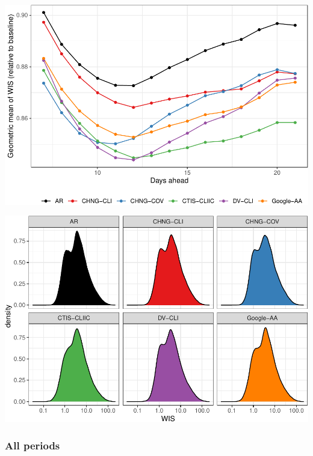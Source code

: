 \documentclass[9pt,twoside,lineno]{pnas-new}
\begin{document}
\begin{center}\includegraphics[width=\linewidth]{fig/fcast-adjusted-1} \end{center}

\begin{center}\includegraphics[width=\linewidth]{fig/wis-densities-1} \end{center}

\hypertarget{all-periods}{%
\subsubsection{All periods}\label{all-periods}}
\end{document}
